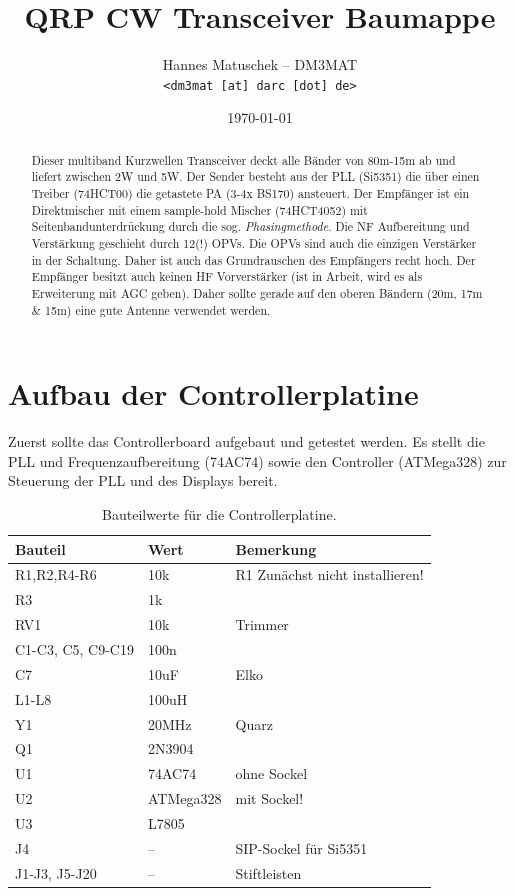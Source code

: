 \documentclass[10pt, a4paper]{paper}
\title{QRP CW Transceiver Baumappe}
\author{Hannes Matuschek -- DM3MAT\\\texttt{<dm3mat [at] darc [dot] de>}}
\date{\today}
\begin{document}
\maketitle

\begin{abstract}
Dieser multiband Kurzwellen Transceiver deckt alle Bänder von 80m-15m ab und liefert zwischen 2W und 5W. Der Sender besteht aus der PLL (Si5351) die über einen Treiber (74HCT00) die getastete PA (3-4x BS170) ansteuert. Der Empfänger ist ein Direktmischer mit einem sample-hold Mischer (74HCT4052) mit Seitenbandunterdrückung durch die sog. \emph{Phasingmethode}. Die NF Aufbereitung und Verstärkung geschieht durch 12(!) OPVs. Die OPVs sind auch die einzigen Verstärker in der Schaltung. Daher ist auch das Grundrauschen des Empfängers recht hoch. Der Empfänger besitzt auch keinen HF Vorverstärker (ist in Arbeit, wird es als Erweiterung mit AGC geben). Daher sollte gerade auf den oberen Bändern (20m, 17m \& 15m) eine gute Antenne verwendet werden. 
\end{abstract}


\section{Aufbau der Controllerplatine} \label{sec:ctrl}
Zuerst sollte das Controllerboard aufgebaut und getestet werden. Es stellt die PLL und Frequenzaufbereitung (74AC74) sowie den Controller (ATMega328) zur Steuerung der PLL und des Displays bereit. 

\begin{table}[!ht]
\centering
\begin{tabular}{|l|l|l|}
\hline 
Bauteil & Wert & Bemerkung \\ \hline 
R1,R2,R4-R6 & 10k & R1 Zunächst nicht installieren! \\
R3 & 1k & \\
RV1 & 10k & Trimmer\\
C1-C3, C5, C9-C19 & 100n & \\
C7 & 10uF & Elko \\
L1-L8 & 100uH & \\
Y1 & 20MHz & Quarz \\
Q1 & 2N3904 & \\
U1 & 74AC74 & ohne Sockel \\
U2 & ATMega328 & mit Sockel! \\
U3 & L7805 & \\
J4 & -- & SIP-Sockel für Si5351 \\
J1-J3, J5-J20 & -- & Stiftleisten \\\hline
\end{tabular}
\caption{Bauteilwerte für die Controllerplatine.}
\end{table}
\end{document}
